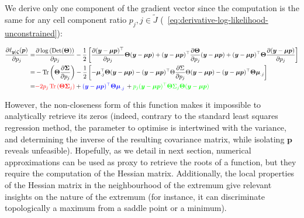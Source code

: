\documentclass[long, final]{jobim}
\DeclareMathOperator*{\Tr}{Tr}
\DeclareMathOperator*{\DET}{Det}
\begin{document}
We derive only one component of the gradient vector since the computation is the same for any cell component ratio $p_j, j \in \widetilde{J}$ (\equationname~\ref{eq:derivative-log-likelihood-unconstrained}):

\begin{equation}
\label{eq:derivative-log-likelihood-unconstrained}
\begin{split}
\frac{\partial \ell_{\boldsymbol{y} | \boldsymbol{\zeta}}(\boldsymbol{p})}{\partial p_j} =&  \frac{\partial \log\left(\DET(\boldsymbol{\Theta})\right)}{\partial p_j} -\frac{1}{2} \left[\frac{\partial (\boldsymbol{y} - \boldsymbol{\mu} \boldsymbol{p})^\top}{\partial p_j}\boldsymbol{\Theta}(\boldsymbol{y} - \boldsymbol{\mu} \boldsymbol{p}) + (\boldsymbol{y} - \boldsymbol{\mu} \boldsymbol{p})^\top\frac{\partial\boldsymbol{\Theta}}{\partial p_j}(\boldsymbol{y} - \boldsymbol{\mu} \boldsymbol{p}) + (\boldsymbol{y} - \boldsymbol{\mu} \boldsymbol{p})^\top\boldsymbol{\Theta} \frac{\partial (\boldsymbol{y} - \boldsymbol{\mu} \boldsymbol{p})}{\partial p_j} \right]\\
=&-\Tr \left(\boldsymbol{\Theta} \frac{\partial \boldsymbol{\Sigma}}{\partial p_j} \right) - \frac{1}{2} \left[ - \boldsymbol{\mu}_{.j}^\top\boldsymbol{\Theta}(\boldsymbol{y} - \boldsymbol{\mu} \boldsymbol{p}) - (\boldsymbol{y} - \boldsymbol{\mu} \boldsymbol{p})^\top\Theta\frac{\partial \Sigma}{\partial p_j}\Theta(\boldsymbol{y} - \boldsymbol{\mu} \boldsymbol{p}) - (\boldsymbol{y} - \boldsymbol{\mu} \boldsymbol{p})^\top\boldsymbol{\Theta}  \boldsymbol{\mu}_{.j} \right] \\
=& \textcolor{red}{-2p_j \Tr \left(\boldsymbol{\Theta}\boldsymbol{\Sigma}_j\right)} + 
\textcolor{blue}{(\boldsymbol{y} - \boldsymbol{\mu} \boldsymbol{p})^\top\boldsymbol{\Theta}  \boldsymbol{\mu}_{.j}} \, + 
\textcolor{green}{p_j (\boldsymbol{y} - \boldsymbol{\mu} \boldsymbol{p})^\top\boldsymbol{\Theta} \Sigma_j \boldsymbol{\Theta} (\boldsymbol{y} - \boldsymbol{\mu} \boldsymbol{p})}
\end{split}
\end{equation}

However, the non-closeness form of this function makes it impossible to analytically retrieve its zeros (indeed, contrary to the standard least squares regression method, the parameter to optimise is intertwined with the variance, and determining the inverse of the resulting covariance matrix, while isolating $\boldsymbol{p}$ reveals unfeasible). Hopefully, as we detail in next section, numerical approximations can be used as proxy to retrieve the roots of a function, but they require the computation of the Hessian matrix. Additionally, the local properties of the Hessian matrix in the neighbourhood of the extremum give relevant insights on the nature of the extremum (for instance, it can discriminate topologically a maximum from a saddle point or a minimum).
\end{document}
